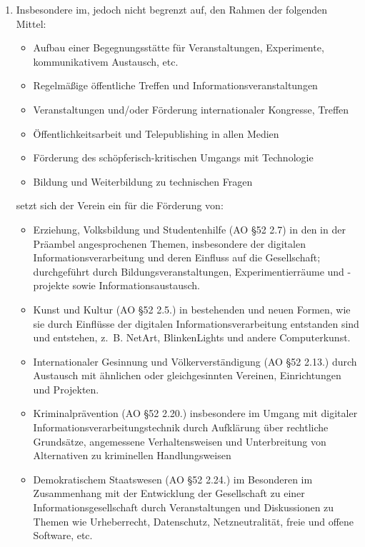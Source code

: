 ﻿\documentclass[10pt,a4paper]{scrartcl}
\begin{document}
\begin{enumerate}
\item Insbesondere im, jedoch nicht begrenzt auf, den Rahmen der folgenden Mittel:
	\begin{itemize}
                \item Aufbau einer Begegnungsstätte für Veranstaltungen, Experimente, kommunikativem Austausch, etc.
		\item Regelmäßige öffentliche Treffen und Informationsveranstaltungen
		\item Veranstaltungen und/oder Förderung internationaler Kongresse, Treffen
		\item Öffentlichkeitsarbeit und Telepublishing in allen Medien
		\item Förderung des schöpferisch-kritischen Umgangs mit Technologie
                \item Bildung und Weiterbildung zu technischen Fragen
	\end{itemize}
	setzt sich der Verein ein für die Förderung von:
	\begin{itemize}
		\item Erziehung, Volksbildung und Studentenhilfe (AO §52 2.7) in den in der Präambel angesprochenen Themen,
			insbesondere der digitalen Informationsverarbeitung und deren Einfluss auf die Gesellschaft;
			durchgeführt durch Bildungsveranstaltungen, Experimentierräume und -projekte sowie Informationsaustausch.
		\item Kunst und Kultur (AO §52 2.5.) in bestehenden und neuen Formen, wie sie durch Einflüsse der digitalen
			Informationsverarbeitung entstanden sind und entstehen, z.\, B. NetArt, BlinkenLights und andere Computerkunst.
                \item Internationaler Gesinnung und Völkerverständigung (AO §52 2.13.) durch Austausch mit ähnlichen oder gleichgesinnten
			Vereinen, Einrichtungen und Projekten.
		\item Kriminalprävention (AO §52 2.20.) insbesondere im Umgang mit digitaler Informationsverarbeitungstechnik durch
			Aufklärung über rechtliche Grundsätze, angemessene Verhaltensweisen und Unterbreitung von Alternativen zu 
			kriminellen Handlungsweisen
		\item Demokratischem Staatswesen (AO §52 2.24.) im Besonderen im Zusammenhang mit der Entwicklung der Gesellschaft 
			zu einer Informationsgesellschaft durch Veranstaltungen und Diskussionen zu Themen wie Urheberrecht, Datenschutz, 
			Netzneutralität, freie und offene Software, etc.
	\end{itemize}
\end{enumerate}
%
%
\end{document}
